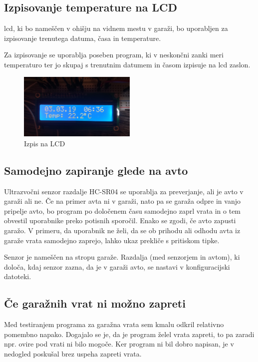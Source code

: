 \documentclass[11pt]{article}
\begin{document}
\subsection{Izpisovanje temperature na LCD}
\gls{lcd}, ki bo nameščen v ohišju na vidnem mestu v garaži, bo uporabljen za izpisovanje trenutega datuma, časa in temperature.

Za izpisovanje se uporablja poseben program, ki v neskončni zanki meri temperaturo ter jo skupaj s trenutnim datumem in časom izpisuje na \gls{lcd} zaslon.

\begin{figure}[h]
\centering
\includegraphics[width=0.5\textwidth]{images/LCD_temp.jpg}
\caption{Izpis na LCD}
\end{figure}

\subsection{Samodejno zapiranje glede na avto}
Ultrazvočni senzor razdalje HC-SR04 se uporablja za preverjanje, ali je avto v garaži ali ne. Če na primer avta ni v garaži, nato pa se garaža odpre in vanjo pripelje avto, bo program po določenem času samodejno zaprl vrata in o tem obvestil uporabnike preko potisnih sporočil. Enako se zgodi, če avto zapusti garažo. V primeru, da uporabnik ne želi, da se ob prihodu ali odhodu avta iz garaže vrata samodejno zaprejo, lahko ukaz prekliče s pritiskom tipke.

Senzor je nameščen na stropu garaže. Razdalja (med senzorjem in avtom), ki določa, kdaj senzor zazna, da je v garaži avto, se nastavi v konfiguracijski datoteki.

\subsection{Če garažnih vrat ni možno zapreti}
Med testiranjem programa za garažna vrata sem kmalu odkril relativno pomembno napako. Dogajalo se je, da je program želel vrata zapreti, to pa zaradi npr. ovire pod vrati ni bilo mogoče. Ker program ni bil dobro napisan, je v nedogled poskušal brez uspeha zapreti vrata.
\end{document}
